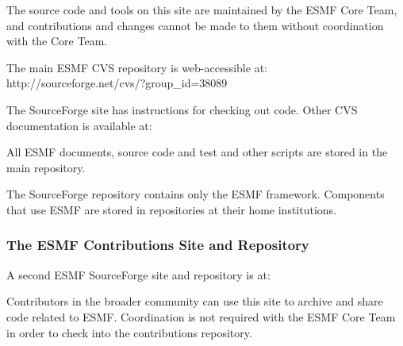 The source code and tools on this site are maintained by the
ESMF Core Team, and contributions and changes cannot be made to
them without coordination with the Core Team.

The main ESMF CVS repository is web-accessible at: \newline
{}
{http://sourceforge.net/cvs/?group_id=38089} 

The SourceForge site has instructions for checking out code.
Other CVS documentation is available at: \newline
{} 

All ESMF documents, source code and test and other scripts are stored
in the main repository.  

The SourceForge repository contains only the ESMF framework.  Components
that use ESMF are stored in repositories at their home institutions.

\subsubsection{The ESMF Contributions Site and Repository}
A second ESMF SourceForge site and repository is at:
\begin{center}
\end{center}

Contributors in the broader community can use this site
to archive and share code related to ESMF.  Coordination is 
not required with the ESMF Core Team in order to check into the
contributions repository.







